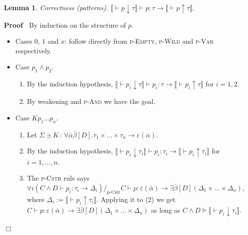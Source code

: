 \documentclass{article}
\newcommand{\assign}{:=}
\newcommand{\colons}{\,:\,}
\newcommand{\tmem}[1]{{\em #1\/}}
\newcommand{\tmname}[1]{\textsc{#1}}
\newenvironment{proof}{\noindent\textbf{Proof\ }}{\hspace*{\fill}$\Box$\medskip}
\newtheorem{lemma}{Lemma}
\begin{document}
\begin{lemma}
  \label{CorrPat}{\tmem{Correctness}} (patterns). $\llbracket \vdash p
  \downarrow \tau \rrbracket \vdash p : \tau \longrightarrow \llbracket \vdash
  p \uparrow \tau \rrbracket$.
\end{lemma}

\begin{proof}
  By induction on the structure of $p$.
  \begin{itemize}
    \item Cases $0$, $1$ and $x$: follow directly from {\tmname{p-Empty}},
    {\tmname{p-Wild}} and {\tmname{p-Var}} respectively.
    
    \item Case $p_1 \wedge p_2$.
    \begin{enumerate}
      \item By the induction hypothesis, $\llbracket \vdash p_i \downarrow
      \tau \rrbracket \vdash p_i : \tau \longrightarrow \llbracket \vdash p_i
      \uparrow \tau \rrbracket$ for $i = 1, 2$.
      
      \item By weakening and {\tmname{p-And}} we have the goal.
    \end{enumerate}
    \item Case $K p_1 \ldots p_n$.
    \begin{enumerate}
      \item Let $\Sigma \ni K \colons \forall \bar{\alpha} \bar{\beta} [D] .
      \tau_1 \times \ldots \times \tau_n \rightarrow \varepsilon
      (\bar{\alpha})$.
      
      \item By the induction hypothesis, $\llbracket \vdash p_i \downarrow
      \tau_i \rrbracket \vdash p_i : \tau_i \longrightarrow \llbracket \vdash
      p_i \uparrow \tau_i \rrbracket$ for $i = 1, \ldots, n$.
      
      \item The {\tmname{p-Cstr}} rule says $\forall i (C \wedge D \vdash p_i
      : \tau_i \longrightarrow \Delta_i) /_{\text{p-Cstr}} C \vdash p :
      \varepsilon (\bar{\alpha}) \longrightarrow \exists \bar{\beta} [D]
      (\Delta_1 \times \ldots \times \Delta_n)$, where $\Delta_i \assign
      \llbracket \vdash p_i \uparrow \tau_i \rrbracket$. Applying it to (2) we
      get $C \vdash p : \varepsilon (\bar{\alpha}) \longrightarrow \exists
      \bar{\beta} [D] (\Delta_1 \times \ldots \times \Delta_n)$ as long as $C
      \wedge D \vDash \llbracket \vdash p_i \downarrow \tau_i \rrbracket$.
      

\end{enumerate}
\end{itemize}
\end{proof}
\end{document}
